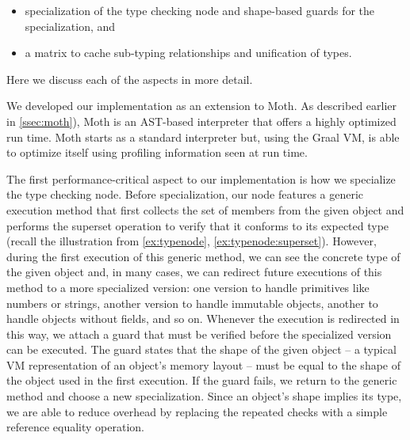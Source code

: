 \begin{itemize}
  \item specialization of the type checking node and shape-based guards for the specialization, and
  \item a matrix to cache sub-typing relationships and unification of types.
\end{itemize}

Here we discuss each of the aspects in more detail.

We developed our implementation as an extension to Moth.
As described earlier in \cref{ssec:moth}),
Moth is an AST-based interpreter that offers a highly optimized run time.
Moth starts as a standard interpreter but,
using the Graal VM,
is able to optimize itself using profiling information seen at run time. 

The first performance-critical aspect to our implementation
is how we specialize the type checking node.
Before specialization,
our node features a generic execution method
that first collects the set of members
from the given object and performs the superset operation
to verify that it conforms to its expected type
(recall the illustration from \cref{ex:typenode},
\cref{ex:typenode:superset}).
However, during the first execution of this generic method,
we can see the concrete type of the given object and,
in many cases,
we can redirect future executions of this method to a more specialized version:
one version to handle primitives like numbers or strings,
another version to handle immutable objects,
another to handle objects without fields,
and so on.
Whenever the execution is redirected in this way,
we attach a guard that must be verified before the specialized version can be executed.
The guard states that the shape of the given object
-- a typical VM representation of an object's memory layout --
must be equal to the shape of the object
used in the first execution.
If the guard fails,
we return to the generic method and choose a new specialization.
Since an object's shape implies its type,
we are able to reduce overhead
by replacing the repeated checks
with a simple reference equality operation.

